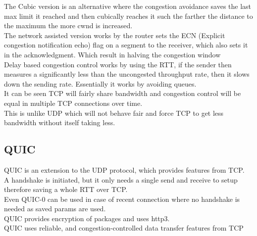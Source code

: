 \documentclass[12pt, a4paper]{article}
\begin{document}
				The Cubic version is an alternative where the congestion avoidance saves the last max limit it reached and then cubically reaches it such the farther the distance to the maximum the more cwnd is increased.\\[4mm]
				The network assisted version works by the router sets the ECN (Explicit congestion notification echo) flag on a segment to the receiver, which also sets it in the acknowledgment. Which result in halving the congestion window\\
				Delay based congestion control works by using the RTT, if the sender then measures a significantly less than the uncongested throughput rate, then it slows down the sending rate. Essentially it works by avoiding queues.\\[4mm]
				It can be seen TCP will fairly share bandwidth and congestion control will be equal in multiple TCP connections over time.\\
				This is unlike UDP which will not behave fair and force TCP to get less bandwidth without itself taking less.
		\subsection{QUIC}
			QUIC is an extension to the UDP protocol, which provides features from TCP.\\
			A handshake is initiated, but it only needs a single send and receive to setup therefore saving a whole RTT over TCP.\\
			Even QUIC-0 can be used in case of recent connection where no handshake is needed as saved params are used.\\
			QUIC provides encryption of packages and uses http3.\\
			QUIC uses reliable, and congestion-controlled data transfer features from TCP
\end{document}
